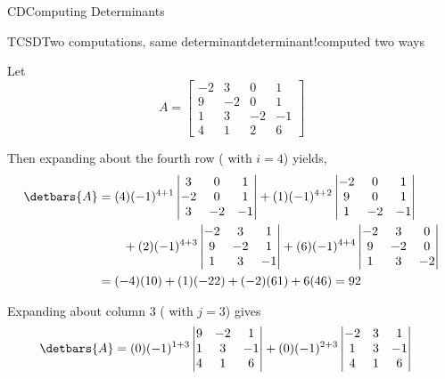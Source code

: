 \begin{subsect}{CD}{Computing Determinants}
\begin{example}{TCSD}{Two computations, same determinant}{determinant!computed two ways}
\begin{para}Let
%
\begin{equation*}
A=
\begin{bmatrix}
-2 & 3 & 0 & 1\\
9 & -2 & 0 & 1\\
1 & 3 & -2 & -1\\
4 & 1 & 2 & 6
\end{bmatrix}
\end{equation*}
\end{para}
%
\begin{para}Then expanding about the fourth row ( with $i=4$) yields,
%
\begin{align*}
\detbars{A}
&=
(4)(-1)^{4+1}
\begin{vmatrix}
 3 & 0 & 1\\
 -2 & 0 & 1\\
 3 & -2 & -1
\end{vmatrix}
+(1)(-1)^{4+2}
\begin{vmatrix}
-2 &  0 & 1\\
9 &  0 & 1\\
1 &  -2 & -1
\end{vmatrix}\\
%
&\quad\quad+(2)(-1)^{4+3}
\begin{vmatrix}
-2 & 3 &  1\\
9 & -2 &  1\\
1 & 3  & -1
\end{vmatrix}
+(6)(-1)^{4+4}
\begin{vmatrix}
-2 & 3 & 0 \\
9 & -2 & 0 \\
1 & 3 & -2
\end{vmatrix}\\
&=
(-4)(10)+(1)(-22)+(-2)(61)+6(46)=92
\end{align*}
\end{para}
%
\begin{para}Expanding about column 3 ( with $j=3$) gives
%
\begin{align*}
\detbars{A}
&=
(0)(-1)^{1+3}
\begin{vmatrix}
9 & -2 & 1\\
1 & 3 & -1\\
4 & 1 & 6
\end{vmatrix}
+
(0)(-1)^{2+3}
\begin{vmatrix}
-2 & 3 & 1\\
1 & 3 & -1\\
4 & 1 & 6
\end{vmatrix}

\end{align*}
\end{para}
\end{example}
\end{subsect}
